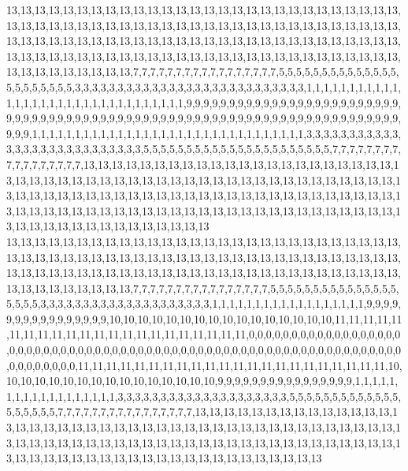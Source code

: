 13,13,13,13,13,13,13,13,13,13,13,13,13,13,13,13,13,13,13,13,13,13,13,13,13,13,13,13,13,13,13,13,13,13,13,13,13,13,13,13,13,13,13,13,13,13,13,13,13,13,13,13,13,13,13,13,13,13,13,13,13,13,13,13,13,13,13,13,13,13,13,13,13,13,13,13,13,13,13,13,13,13,13,13,13,13,13,13,13,13,13,13,13,13,13,13,13,13,13,13,13,13,13,13,13,13,13,13,13,13,13,13,13,13,13,13,13,13,13,13,13,7,7,7,7,7,7,7,7,7,7,7,7,7,7,7,7,7,5,5,5,5,5,5,5,5,5,5,5,5,5,5,5,5,5,5,5,5,5,5,3,3,3,3,3,3,3,3,3,3,3,3,3,3,3,3,3,3,3,3,3,3,3,3,3,3,3,1,1,1,1,1,1,1,1,1,1,1,1,1,1,1,1,1,1,1,1,1,1,1,1,1,1,1,1,1,1,1,1,9,9,9,9,9,9,9,9,9,9,9,9,9,9,9,9,9,9,9,9,9,9,9,9,9,9,9,9,9,9,9,9,9,9,9,9,9,9,9,9,9,9,9,9,9,9,9,9,9,9,9,9,9,9,9,9,9,9,9,9,9,9,9,9,9,9,9,9,9,9,9,9,9,9,1,1,1,1,1,1,1,1,1,1,1,1,1,1,1,1,1,1,1,1,1,1,1,1,1,1,1,1,1,1,1,1,3,3,3,3,3,3,3,3,3,3,3,3,3,3,3,3,3,3,3,3,3,3,3,3,3,3,3,5,5,5,5,5,5,5,5,5,5,5,5,5,5,5,5,5,5,5,5,5,5,7,7,7,7,7,7,7,7,7,7,7,7,7,7,7,7,7,13,13,13,13,13,13,13,13,13,13,13,13,13,13,13,13,13,13,13,13,13,13,13,13,13,13,13,13,13,13,13,13,13,13,13,13,13,13,13,13,13,13,13,13,13,13,13,13,13,13,13,13,13,13,13,13,13,13,13,13,13,13,13,13,13,13,13,13,13,13,13,13,13,13,13,13,13,13,13,13,13,13,13,13,13,13,13,13,13,13,13,13,13,13,13,13,13,13,13,13,13,13,13,13,13,13,13,13,13,13,13,13,13,13,13,13,13,13,13,13,13
13,13,13,13,13,13,13,13,13,13,13,13,13,13,13,13,13,13,13,13,13,13,13,13,13,13,13,13,13,13,13,13,13,13,13,13,13,13,13,13,13,13,13,13,13,13,13,13,13,13,13,13,13,13,13,13,13,13,13,13,13,13,13,13,13,13,13,13,13,13,13,13,13,13,13,13,13,13,13,13,13,13,13,13,13,13,13,13,13,13,13,13,13,7,7,7,7,7,7,7,7,7,7,7,7,7,7,7,7,5,5,5,5,5,5,5,5,5,5,5,5,5,5,5,5,5,5,5,3,3,3,3,3,3,3,3,3,3,3,3,3,3,3,3,3,3,3,3,1,1,1,1,1,1,1,1,1,1,1,1,1,1,1,1,1,1,9,9,9,9,9,9,9,9,9,9,9,9,9,9,9,9,10,10,10,10,10,10,10,10,10,10,10,10,10,10,10,10,11,11,11,11,11,11,11,11,11,11,11,11,11,11,11,11,11,11,11,11,11,11,0,0,0,0,0,0,0,0,0,0,0,0,0,0,0,0,0,0,0,0,0,0,0,0,0,0,0,0,0,0,0,0,0,0,0,0,0,0,0,0,0,0,0,0,0,0,0,0,0,0,0,0,0,0,0,0,0,0,0,0,0,0,0,0,0,0,0,0,0,0,0,0,11,11,11,11,11,11,11,11,11,11,11,11,11,11,11,11,11,11,11,11,11,11,10,10,10,10,10,10,10,10,10,10,10,10,10,10,10,10,9,9,9,9,9,9,9,9,9,9,9,9,9,9,9,9,1,1,1,1,1,1,1,1,1,1,1,1,1,1,1,1,1,1,3,3,3,3,3,3,3,3,3,3,3,3,3,3,3,3,3,3,3,3,5,5,5,5,5,5,5,5,5,5,5,5,5,5,5,5,5,5,5,7,7,7,7,7,7,7,7,7,7,7,7,7,7,7,7,13,13,13,13,13,13,13,13,13,13,13,13,13,13,13,13,13,13,13,13,13,13,13,13,13,13,13,13,13,13,13,13,13,13,13,13,13,13,13,13,13,13,13,13,13,13,13,13,13,13,13,13,13,13,13,13,13,13,13,13,13,13,13,13,13,13,13,13,13,13,13,13,13,13,13,13,13,13,13,13,13,13,13,13,13,13,13,13,13,13,13,13,13
